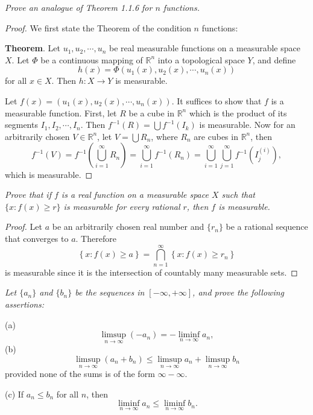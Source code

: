 \begin{problem}\em
Prove an analogue of Theorem 1.1.6 for $n$ functions.
\end{problem}
\begin{proof}
We first state the Theorem of the condition $n$ functions:\par
\textbf{Theorem}. Let $u_1,u_2,\cdots,u_n$ be real measurable functions on a measurable space $X$. Let $\Phi$ be a continuous mapping of $\mathbb{R}^n$ into a topological space $Y$, and define 
$$h(x)=\Phi(u_1(x),u_2(x),\cdots,u_n(x))$$
for all $x\in X$. Then $h:X\to Y$ is measurable.\par
Let $f(x)=(u_1(x),u_2(x),\cdots,u_n(x))$. It suffices to show that $f$ is a measurable function. First, let $R$ be a cube in $\mathbb{R}^n$ which is the product of its segments $I_1,I_2,\cdots,I_n$. Then $f^{-1}\left( R \right) =\bigcup{f^{-1}\left( I_k \right)}$ is measurable. Now for an arbitrarily chosen $V\in\mathbb{R}^n$, let $V=\bigcup R_n$, where $R_n$ are cubes in $\mathbb{R}^n$, then 
$$
f^{-1}\left( V \right) =f^{-1}\left( \bigcup_{i=1}^{\infty}{R_n} \right) =\bigcup_{i=1}^{\infty}{f^{-1}\left( R_n \right)}=\bigcup_{i=1}^{\infty}{\bigcup_{j=1}^{\infty}{f^{-1}\left( I_{j}^{\left( i \right)} \right)}},
$$
which is measurable.
\end{proof}
\begin{problem}\em
Prove that if $f$ is a real function on a measurable space $X$ such that $\{x:f(x)\ge r\}$ is measurable for every rational $r$, then $f$ is measurable.
\end{problem}
\begin{proof}
Let $a$ be an arbitrarily chosen real number and $\{r_n\}$ be a rational sequence that converges to $a$. Therefore 
$$
\left\{ x:f\left( x \right) \ge a \right\} =\bigcap_{n=1}^{\infty}{\left\{ x:f\left( x \right) \ge r_n \right\}}
$$
is measurable since it is the intersection of countably many measurable sets.
\end{proof}
\begin{problem}\em
Let $\{a_n\}$ and $\{b_n\}$ be the sequences in $[-\infty,+\infty]$, and prove the following assertions:\par
(a)
$$\limsup_{n\to\infty}(-a_n)=-\liminf_{n\to\infty}a_n,$$
(b)
$$\limsup_{n\to\infty}(a_n+b_n)\le\limsup_{n\to\infty}a_n+\limsup_{n\to\infty}b_n$$
provided none of the sums is of the form $\infty-\infty$.\par
(c) If $a_n\le b_n$ for all $n$, then 
$$\liminf_{n\to\infty}a_n\le\liminf_{n\to\infty}b_n.$$
\end{problem}

